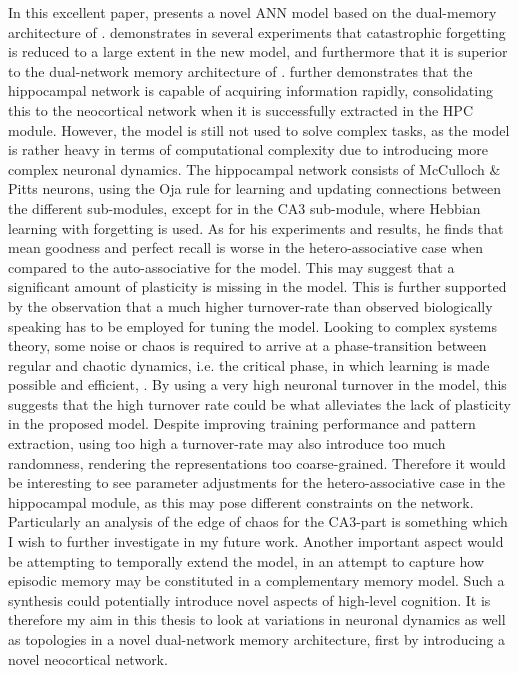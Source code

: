 In this excellent paper, \cite{Hattori2014} presents a novel ANN model based on the dual-memory architecture of \cite{McClelland1995}. \cite{Hattori2014} demonstrates in several experiments that catastrophic forgetting is reduced to a large extent in the new model, and furthermore that it is superior to the dual-network memory architecture of \cite{Ans1997, French1997, Hattori2010}. \cite{Hattori2014} further demonstrates that the hippocampal network is capable of acquiring information rapidly, consolidating this to the neocortical network when it is successfully extracted in the HPC module.
However, the model is still not used to solve complex tasks, as the model is rather heavy in terms of computational complexity due to introducing more complex neuronal dynamics. The hippocampal network consists of McCulloch \& Pitts neurons, using the Oja rule for learning and updating connections between the different sub-modules, except for in the CA3 sub-module, where Hebbian learning with forgetting is used.
As for his experiments and results, he finds that mean goodness and perfect recall is worse in the hetero-associative case when compared to the auto-associative for the model. This may suggest that a significant amount of plasticity is missing in the model. This is further supported by the observation that a much higher turnover-rate than observed biologically speaking has to be employed for tuning the model. Looking to complex systems theory, some noise or chaos is required to arrive at a phase-transition between regular and chaotic dynamics, i.e. the critical phase, in which learning is made possible and efficient, \cite{Langton1990, Newman2003}. By using a very high neuronal turnover in the model, this suggests that the high turnover rate could be what alleviates the lack of plasticity in the proposed model. Despite improving training performance and pattern extraction, using too high a turnover-rate may also introduce too much randomness, rendering the representations too coarse-grained. Therefore it would be interesting to see parameter adjustments for the hetero-associative case in the hippocampal module, as this may pose different constraints on the network. Particularly an analysis of the edge of chaos for the CA3-part is something which I wish to further investigate in my future work. Another important aspect would be attempting to temporally extend the model, in an attempt to capture how episodic memory may be constituted in a complementary memory model. Such a synthesis could potentially introduce novel aspects of high-level cognition. It is therefore my aim in this thesis to look at variations in neuronal dynamics as well as topologies in a novel dual-network memory architecture, first by introducing a novel neocortical network.

